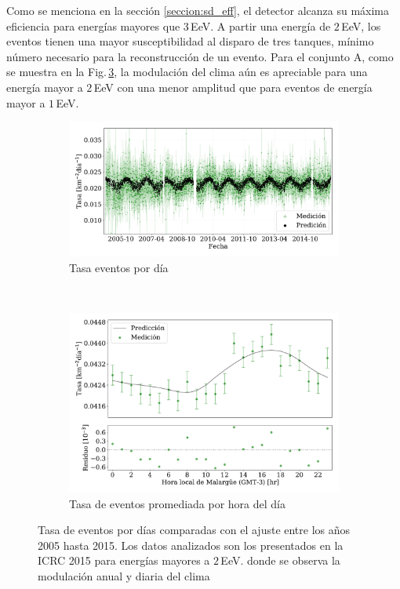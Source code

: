         Como se menciona en la sección \ref{seccion:sd_eff}, el detector alcanza su máxima eficiencia para energías mayores que 3\,EeV. A partir una energía de $2\,$EeV, los eventos tienen una mayor susceptibilidad al disparo de tres tanques, mínimo número necesario para la reconstrucción de un evento. Para el conjunto A, como se muestra en la Fig.\,\ref{fig:rate_2015_05-15_2EeV}, la modulación del clima aún es apreciable para una energía mayor a $2\,$EeV con una menor amplitud que para eventos de energía mayor a $1\,$EeV. 

        \begin{figure}[H]
            \centering
            \begin{subfigure}[b]{0.9\textwidth}
            \includegraphics[width=\textwidth]{Graphs/rate_dayly/herald_old_above_2EeV_rate_day.pdf}
            \caption{Tasa eventos por día}\label{fig:rate_dayly_ICRC_2015_2EeV}
            \end{subfigure}\\
            \begin{subfigure}[b]{0.9\textwidth}
            \includegraphics[width=\textwidth]{Graphs/rate_hour_of_the_day/herald_old_above_2EeV_hour_of_the_day.pdf}
            \caption{Tasa de eventos promediada por hora del día }\label{fig:rate_hod_ICRC_2015_2EeV}
            \end{subfigure}%
            \caption{Tasa de eventos por días comparadas con el ajuste entre los años 2005 hasta 2015. Los datos analizados son los presentados en la ICRC 2015 para energías mayores a $2\,$EeV. donde se observa la modulación anual y diaria del clima }\label{fig:rate_2015_05-15_2EeV}
        \end{figure}

